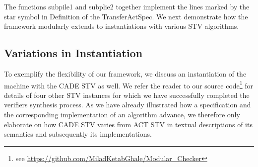 \documentclass[10pt,conference]{IEEEtran}
\begin{document}
The functions subpile1 and subplie2 together implement the lines marked by the star symbol in Definition of the TransferActSpec. We next demonstrate how the framework modularly extends to instantiations  with various STV algorithms.
\subsection{Variations in Instantiation}
To exemplify the flexibility of our framework, we discuss an instantiation of the machine with the CADE STV as well. We refer the reader to our source code\footnote{see  \url{https://github.com/MiladKetabGhale/Modular_Checker}} for details of four other STV instances for which we have successfully completed the verifiers synthesis process. 
As we have already illustrated how a specification and the corresponding implementation of an algorithm advance, we therefore only elaborate on how CADE STV varies from ACT STV in textual descriptions of its  semantics and subsequently its implementations. 
\end{document}
